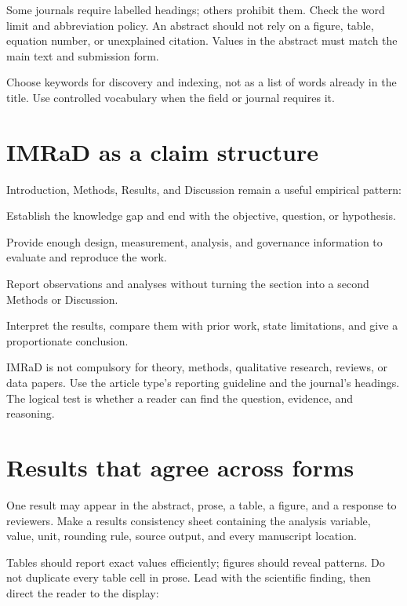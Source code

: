 Some journals require labelled headings; others prohibit them. Check the word
limit and abbreviation policy. An abstract should not rely on a figure, table,
equation number, or unexplained citation. Values in the abstract must match the
main text and submission form.

Choose keywords for discovery and indexing, not as a list of words already in
the title. Use controlled vocabulary when the field or journal requires it.

\section{IMRaD as a claim structure}

Introduction, Methods, Results, and Discussion remain a useful empirical
pattern:

\begin{description}[style=nextline,leftmargin=1.6em]
  \item[Introduction] Establish the knowledge gap and end with the objective,
  question, or hypothesis.
  \item[Methods] Provide enough design, measurement, analysis, and governance
  information to evaluate and reproduce the work.
  \item[Results] Report observations and analyses without turning the section
  into a second Methods or Discussion.
  \item[Discussion] Interpret the results, compare them with prior work, state
  limitations, and give a proportionate conclusion.
\end{description}

IMRaD is not compulsory for theory, methods, qualitative research, reviews, or
data papers. Use the article type's reporting guideline and the journal's
headings. The logical test is whether a reader can find the question, evidence,
and reasoning.

\section{Results that agree across forms}

One result may appear in the abstract, prose, a table, a figure, and a response
to reviewers. Make a results consistency sheet containing the analysis variable,
value, unit, rounding rule, source output, and every manuscript location.

Tables should report exact values efficiently; figures should reveal patterns.
Do not duplicate every table cell in prose. Lead with the scientific finding,
then direct the reader to the display:

